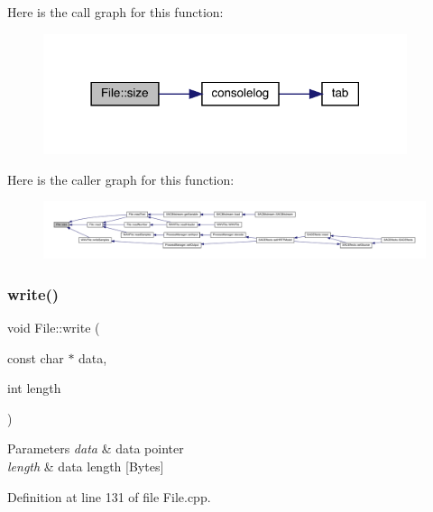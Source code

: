 Here is the call graph for this function\+:
\nopagebreak
\begin{figure}[H]
\begin{center}
\leavevmode
\includegraphics[width=302pt]{class_file_afcaf98328e440ccaedb20e310dc6b6c4_cgraph}
\end{center}
\end{figure}
Here is the caller graph for this function\+:
\nopagebreak
\begin{figure}[H]
\begin{center}
\leavevmode
\includegraphics[width=350pt]{class_file_afcaf98328e440ccaedb20e310dc6b6c4_icgraph}
\end{center}
\end{figure}
\mbox{\label{class_file_a1259d180d1a2ff95bcccecff547dc839}} 
\subsubsection{\texorpdfstring{write()}{write()}}
{\footnotesize\ttfamily void File\+::write (\begin{DoxyParamCaption}\item[{const char $\ast$}]{data,  }\item[{int}]{length }\end{DoxyParamCaption})}


\begin{DoxyParams}{Parameters}
{\em data} & data pointer \\
\hline
{\em length} & data length \mbox{[}Bytes\mbox{]} \\
\hline
\end{DoxyParams}


Definition at line 131 of file File.\+cpp.

